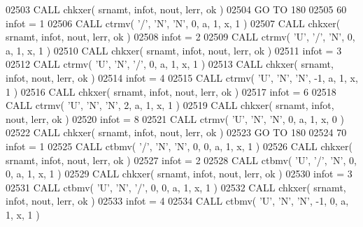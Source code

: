 \begin{DoxyCode}
02503       \textcolor{keyword}{CALL }chkxer( srnamt, infot, nout, lerr, ok )
02504       \textcolor{keywordflow}{GO TO} 180
02505    60 infot = 1
02506       \textcolor{keyword}{CALL }ctrmv( \textcolor{stringliteral}{'/'}, \textcolor{stringliteral}{'N'}, \textcolor{stringliteral}{'N'}, 0, a, 1, x, 1 )
02507       \textcolor{keyword}{CALL }chkxer( srnamt, infot, nout, lerr, ok )
02508       infot = 2
02509       \textcolor{keyword}{CALL }ctrmv( \textcolor{stringliteral}{'U'}, \textcolor{stringliteral}{'/'}, \textcolor{stringliteral}{'N'}, 0, a, 1, x, 1 )
02510       \textcolor{keyword}{CALL }chkxer( srnamt, infot, nout, lerr, ok )
02511       infot = 3
02512       \textcolor{keyword}{CALL }ctrmv( \textcolor{stringliteral}{'U'}, \textcolor{stringliteral}{'N'}, \textcolor{stringliteral}{'/'}, 0, a, 1, x, 1 )
02513       \textcolor{keyword}{CALL }chkxer( srnamt, infot, nout, lerr, ok )
02514       infot = 4
02515       \textcolor{keyword}{CALL }ctrmv( \textcolor{stringliteral}{'U'}, \textcolor{stringliteral}{'N'}, \textcolor{stringliteral}{'N'}, -1, a, 1, x, 1 )
02516       \textcolor{keyword}{CALL }chkxer( srnamt, infot, nout, lerr, ok )
02517       infot = 6
02518       \textcolor{keyword}{CALL }ctrmv( \textcolor{stringliteral}{'U'}, \textcolor{stringliteral}{'N'}, \textcolor{stringliteral}{'N'}, 2, a, 1, x, 1 )
02519       \textcolor{keyword}{CALL }chkxer( srnamt, infot, nout, lerr, ok )
02520       infot = 8
02521       \textcolor{keyword}{CALL }ctrmv( \textcolor{stringliteral}{'U'}, \textcolor{stringliteral}{'N'}, \textcolor{stringliteral}{'N'}, 0, a, 1, x, 0 )
02522       \textcolor{keyword}{CALL }chkxer( srnamt, infot, nout, lerr, ok )
02523       \textcolor{keywordflow}{GO TO} 180
02524    70 infot = 1
02525       \textcolor{keyword}{CALL }ctbmv( \textcolor{stringliteral}{'/'}, \textcolor{stringliteral}{'N'}, \textcolor{stringliteral}{'N'}, 0, 0, a, 1, x, 1 )
02526       \textcolor{keyword}{CALL }chkxer( srnamt, infot, nout, lerr, ok )
02527       infot = 2
02528       \textcolor{keyword}{CALL }ctbmv( \textcolor{stringliteral}{'U'}, \textcolor{stringliteral}{'/'}, \textcolor{stringliteral}{'N'}, 0, 0, a, 1, x, 1 )
02529       \textcolor{keyword}{CALL }chkxer( srnamt, infot, nout, lerr, ok )
02530       infot = 3
02531       \textcolor{keyword}{CALL }ctbmv( \textcolor{stringliteral}{'U'}, \textcolor{stringliteral}{'N'}, \textcolor{stringliteral}{'/'}, 0, 0, a, 1, x, 1 )
02532       \textcolor{keyword}{CALL }chkxer( srnamt, infot, nout, lerr, ok )
02533       infot = 4
02534       \textcolor{keyword}{CALL }ctbmv( \textcolor{stringliteral}{'U'}, \textcolor{stringliteral}{'N'}, \textcolor{stringliteral}{'N'}, -1, 0, a, 1, x, 1 )

\end{DoxyCode}

